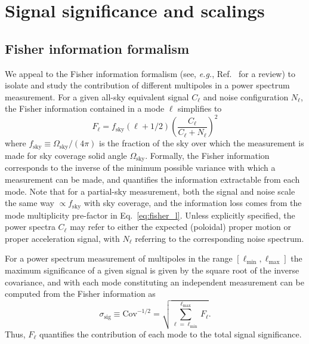\documentclass[prd,aps,twocolumn,nofootinbib,superscriptaddress,preprintnumbers,balancelastpage,longbibliography,floatfix]{revtex4-1}
\begin{document}
\section{Signal significance and scalings} 
\label{app:significance}

\subsection{Fisher information formalism}

We appeal to the Fisher information formalism (see, \emph{e.g.}, Ref.~\cite{Edwards:2017mnf} for a review) to isolate and study the contribution of different multipoles in a power spectrum measurement. 
For a given all-sky equivalent signal $C_{\ell}$ and noise configuration $N_{\ell}$, the Fisher information contained in a mode $\ell$  simplifies to~\cite{Edwards:2017mnf}
\begin{equation}
F_\ell = f_\mathrm{sky}(\ell + 1/2) \left(\frac{C_{\ell}}{C_{\ell} + N_{\ell}}\right)^2
\label{eq:fisher_l}
\end{equation}
where $f_\mathrm{sky}\equiv \Omega_\mathrm{sky}/(4\pi)$ is the fraction of the sky over which the measurement is made for sky coverage solid angle $\Omega_\mathrm{sky}$. Formally, the Fisher information corresponds to the inverse of the minimum possible variance with which a measurement can be made, and quantifies the information extractable from each mode. Note that for a partial-sky measurement, both the signal and noise scale the same way $\propto f_\mathrm{sky}$ with sky coverage, and the information loss comes from the mode multiplicity pre-factor in Eq.~\eqref{eq:fisher_l}. Unless explicitly specified, the power spectra $C_{\ell}$ may refer to either the expected (poloidal) proper motion or proper acceleration signal, with $N_\ell$ referring to the corresponding noise spectrum.

For a power spectrum measurement of multipoles in the range $[\ell_\mathrm{min}, \ell_\mathrm{max}]$ the maximum significance of a given signal is given by the square root of the inverse covariance, and with each mode constituting an independent measurement can be computed from the Fisher information as
\begin{equation}
\sigma_\mathrm{sig}\equiv\mathrm{Cov}^{-1/2}=\sqrt{\sum_{\ell = \ell_\mathrm{min}}^{\ell_\mathrm{max}}F_\ell}.
\label{eq:signif}
\end{equation}
Thus, $F_\ell$ quantifies the contribution of each mode to the total signal significance. 
\end{document}
